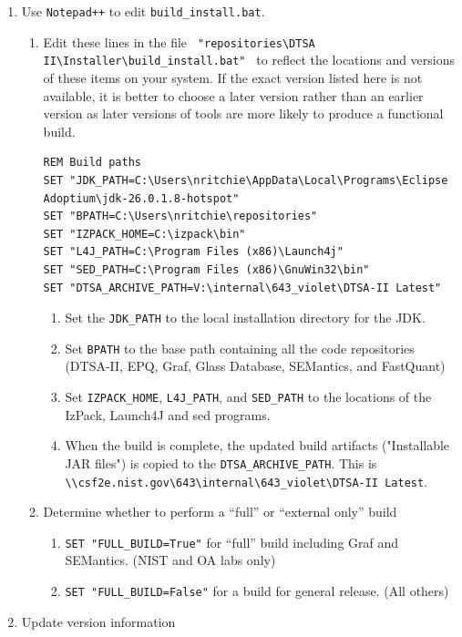 \documentclass{article}
\begin{document}
\begin{enumerate}
    \item Use \verb|Notepad++| to edit \verb|build_install.bat|.
    \begin{enumerate}
        \item Edit these lines in the file \verb| "repositories\DTSA II\Installer\build_install.bat" | to reflect the locations and versions of these items on your system. If the exact version listed here is not available, it is better to choose a later version rather than an earlier version as later versions of tools are more likely to produce a functional build.
        \begin{verbatim}
REM Build paths
SET "JDK_PATH=C:\Users\nritchie\AppData\Local\Programs\Eclipse Adoptium\jdk-26.0.1.8-hotspot"
SET "BPATH=C:\Users\nritchie\repositories"
SET "IZPACK_HOME=C:\izpack\bin"
SET "L4J_PATH=C:\Program Files (x86)\Launch4j"
SET "SED_PATH=C:\Program Files (x86)\GnuWin32\bin"
SET "DTSA_ARCHIVE_PATH=V:\internal\643_violet\DTSA-II Latest"
        \end{verbatim}
        \begin{enumerate}
            \item Set the \verb|JDK_PATH| to the local installation directory for the JDK.
            \item Set \verb|BPATH| to the base path containing all the code repositories (DTSA-II, EPQ, Graf, Glass Database, SEMantics, and FastQuant)
            \item Set \verb|IZPACK_HOME|, \verb|L4J_PATH|, and \verb|SED_PATH| to the locations of the IzPack, Launch4J and sed programs.
            \item When the build is complete, the updated build artifacts ("Installable JAR files") is copied to the \verb|DTSA_ARCHIVE_PATH|.  This is \verb|\\csf2e.nist.gov\643\internal\643_violet\DTSA-II Latest|.
        \end{enumerate}
        \item Determine whether to perform a ``full'' or ``external only'' build
        \begin{enumerate}
            \item \verb|SET "FULL_BUILD=True"| for ``full'' build including Graf and SEMantics. (NIST and OA labs only)
            \item \verb|SET "FULL_BUILD=False"| for a build for general release. (All others)
        \end{enumerate}
    \end{enumerate}
    \item Update version information

\end{enumerate}
\end{document}
